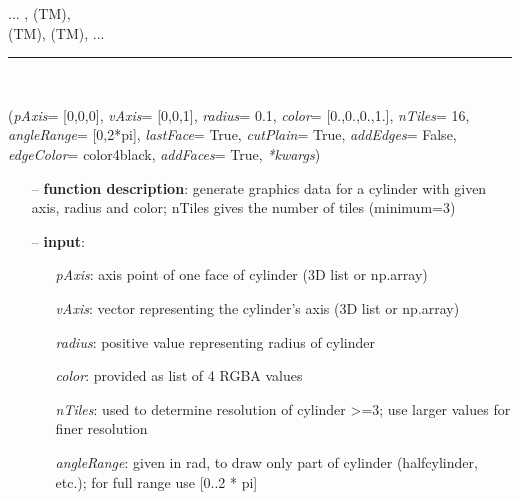 \begin{itemize}[leftmargin=1.4cm]
\begin{itemize}[leftmargin=1.4cm]
\begin{itemize}[leftmargin=1.4cm]
\begin{itemize}[leftmargin=0.5cm]
\begin{itemize}[leftmargin=1.4cm]
\begin{itemize}[leftmargin=1.4cm]
\begin{itemize}[leftmargin=0.5cm]
\begin{itemize}[leftmargin=1.4cm]
\begin{itemize}[leftmargin=0.5cm]
 ...
, 
 (TM), 
\\  (TM), 
 (TM), 
 ...

\ei

%
\noindent\rule{8cm}{0.75pt}\vspace{1pt} \\ 
\begin{flushleft}
\label{sec:graphicsDataUtilities:GraphicsDataCylinder}
({\it pAxis}= [0,0,0], {\it vAxis}= [0,0,1], {\it radius}= 0.1, {\it color}= [0.,0.,0.,1.], {\it nTiles}= 16, {\it angleRange}= [0,2*pi], {\it lastFace}= True, {\it cutPlain}= True, {\it addEdges}= False, {\it edgeColor}= color4black, {\it addFaces}= True, {\it **kwargs})
\end{flushleft}
\setlength{\itemindent}{0.7cm}
\begin{itemize}[leftmargin=0.7cm]
\item[--]
{\bf function description}: generate graphics data for a cylinder with given axis, radius and color; nTiles gives the number of tiles (minimum=3)
\item[--]
{\bf input}: \vspace{-6pt}
\begin{itemize}[leftmargin=1.2cm]
\setlength{\itemindent}{-0.7cm}
\item[]{\it pAxis}: axis point of one face of cylinder (3D list or np.array)
\item[]{\it vAxis}: vector representing the cylinder's axis (3D list or np.array)
\item[]{\it radius}: positive value representing radius of cylinder
\item[]{\it color}: provided as list of 4 RGBA values
\item[]{\it nTiles}: used to determine resolution of cylinder >=3; use larger values for finer resolution
\item[]{\it angleRange}: given in rad, to draw only part of cylinder (halfcylinder, etc.); for full range use [0..2 * pi]

\end{itemize}
\end{itemize}
\end{itemize}
\end{itemize}
\end{itemize}
\end{itemize}
\end{itemize}
\end{itemize}
\end{itemize}
\end{itemize}
\end{itemize}
